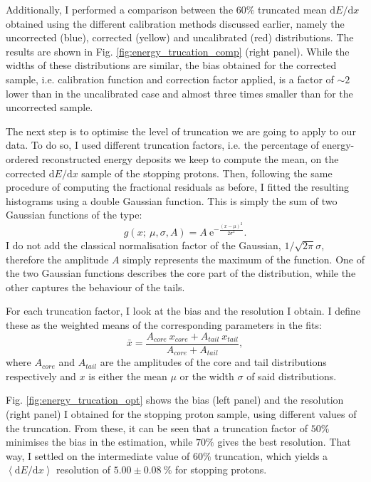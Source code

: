 Additionally, I performed a comparison between the $60\%$ truncated mean $\mathrm{d}E/\mathrm{d}x$ obtained using the different calibration methods discussed earlier, namely the uncorrected (blue), corrected (yellow) and uncalibrated (red) distributions. The results are shown in Fig. \ref{fig:energy_trucation_comp} (right panel). While the widths of these distributions are similar, the bias obtained for the corrected sample, i.e. calibration function and correction factor applied, is a factor of $\sim2$ lower than in the uncalibrated case and almost three times smaller than for the uncorrected sample.

The next step is to optimise the level of truncation we are going to apply to our data. To do so, I used different truncation factors, i.e. the percentage of energy-ordered reconstructed energy deposits we keep to compute the mean, on the corrected $\mathrm{d}E/\mathrm{d}x$ sample of the stopping protons. Then, following the same procedure of computing the fractional residuals as before, I fitted the resulting histograms using a double Gaussian function. This is simply the sum of two Gaussian functions of the type:
\begin{equation}
	g(x;~\mu, \sigma, A) = A~\mathrm{e}^{-\frac{(x-\mu)^{2}}{2\sigma^{2}}}.
\end{equation}
I do not add the classical normalisation factor of the Gaussian, $1/\sqrt{2\pi}\sigma$, therefore the amplitude $A$ simply represents the maximum of the function. One of the two Gaussian functions describes the core part of the distribution, while the other captures the behaviour of the tails.

For each truncation factor, I look at the bias and the resolution I obtain. I define these as the weighted means of the corresponding parameters in the fits:
\begin{equation}
	\bar{x} = \frac{A_{core}~x_{core}+A_{tail}~x_{tail}}{A_{core}+A_{tail}},
\end{equation}
where $A_{core}$ and $A_{tail}$ are the amplitudes of the core and tail distributions respectively and $x$ is either the mean $\mu$ or the width $\sigma$ of said distributions.

Fig. \ref{fig:energy_trucation_opt} shows the bias (left panel) and the resolution (right panel) I obtained for the stopping proton sample, using different values of the truncation. From these, it can be seen that a truncation factor of $50\%$ minimises the bias in the estimation, while $70\%$ gives the best resolution. That way, I settled on the intermediate value of $60\%$ truncation, which yields a $\left<\mathrm{d}E/\mathrm{d}x\right>$ resolution of $5.00\pm0.08~\%$ for stopping protons.

